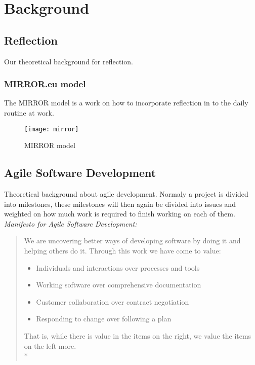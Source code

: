 \chapter{Background}

\section{Reflection}
Our theoretical background for reflection.
\subsection{MIRROR.eu model}
The MIRROR model is a work on how to incorporate reflection in to the daily routine at work.

\begin{figure}[!htpb]
\label{logo}
\centering
	\texttt{[image: mirror]}
\caption{MIRROR model}
\end{figure}


\section{Agile Software Development}
Theoretical background about agile development. Normaly a project is divided into milestones, these milestones will then again be divided into issues and weighted on how much work is required to finish working on each of them.\linebreak
\emph{Manifesto for Agile Software Development:}\cite{agilemanifesto}
\begin{quotation}
We are uncovering better ways of developing software by doing it and helping others do it. Through this work we have come to value:
\begin{itemize}
\item Individuals and interactions over processes and tools
\item Working software over comprehensive documentation
\item Customer collaboration over contract negotiation
\item Responding to change over following a plan
\end{itemize}
That is, while there is value in the items on
the right, we value the items on the left more.\\*
\end{quotation}

